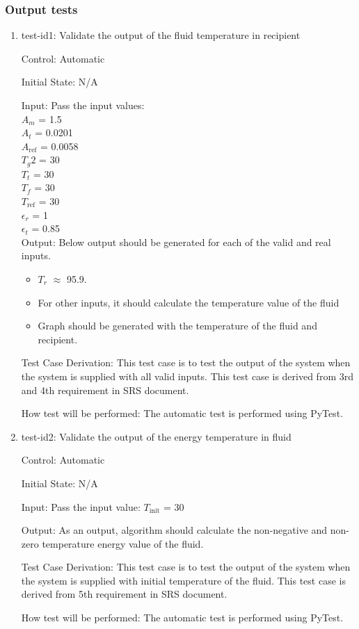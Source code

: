 \documentclass[12pt, titlepage]{article}
\begin{document}
\subsubsection{Output tests}
\label{output_functional_tests}
\begin{enumerate}

\item{test-id1: Validate the output of the fluid temperature in recipient  \\}

Control: Automatic 
					
Initial State: N/A
					
Input: Pass the input values: \\ 
       $A_m$ = 1.5 \\
       $A_t$ = 0.0201 \\
       $A_{\text{ref}}$ = 0.0058 \\
       $T_g2$ = 30 \\
       $T_t$ = 30 \\
       $T_f$ = 30 \\
       $T_\text{ref}$ = 30 \\ 
       $\epsilon_r$ = 1 \\
       $\epsilon_t$ = 0.85 \\
       
					
Output: Below output should be generated for each of the valid and real inputs. 
\begin{itemize}
    \item $T_r$ $\approx$ 95.9. 
    \item For other inputs, it should calculate the temperature value of the fluid 
    \item Graph should be generated with the temperature of the fluid and recipient.  
\end{itemize} 

Test Case Derivation: This test case is to test the output of the system when the system is supplied with all valid inputs. This test case is derived from 3rd and 4th requirement in SRS document.  
					
How test will be performed: The automatic test is performed using PyTest.  


\item{test-id2: Validate the output of the energy temperature in fluid  \\}

Control: Automatic 
					
Initial State: N/A
					
Input: Pass the input value: $T_\text{init}$ = 30 
					
Output: As an output, algorithm should calculate the non-negative and non-zero temperature energy value of the fluid.  

Test Case Derivation: This test case is to test the output of the system when the system is supplied with initial temperature of the fluid. This test case is derived from 5th requirement in SRS document.  
					
How test will be performed: The automatic test is performed using PyTest.  

\end{enumerate}   
\end{document}
